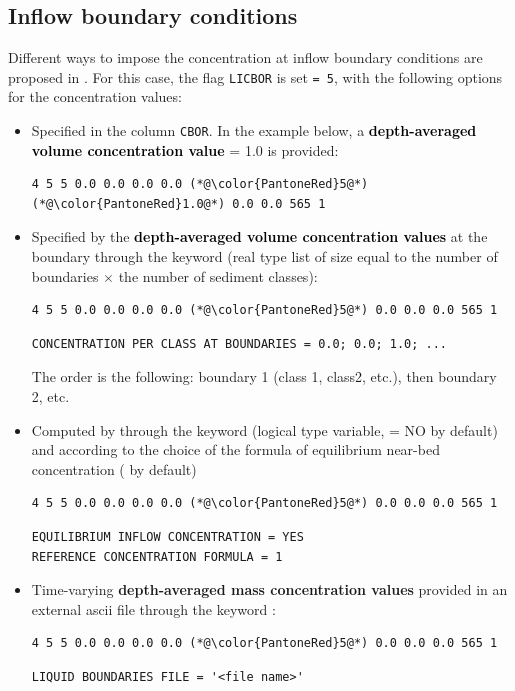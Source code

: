\subsection{Inflow boundary conditions}
Different ways to impose the concentration at inflow boundary conditions are proposed in \sisyphe. For this case, the flag \texttt{LICBOR} is set \texttt{= 5}, with the following options for the concentration values:
\begin{itemize}
\item Specified in the column \texttt{CBOR}. In the example below, a \textcolor{black}{\textbf{depth-averaged volume concentration value}} {\ttfamily = 1.0} is provided:
\begin{lstlisting}[frame=trBL]
4 5 5 0.0 0.0 0.0 0.0 (*@\color{PantoneRed}5@*) (*@\color{PantoneRed}1.0@*) 0.0 0.0 565 1
\end{lstlisting}
\item Specified by the \textcolor{black}{\textbf{depth-averaged volume concentration values}} at the boundary through the keyword  (real type list of size equal to the number of boundaries $\times$ the number of sediment classes):
\begin{lstlisting}[frame=trBL]
4 5 5 0.0 0.0 0.0 0.0 (*@\color{PantoneRed}5@*) 0.0 0.0 0.0 565 1
\end{lstlisting}
\begin{lstlisting}[frame=trBL]
CONCENTRATION PER CLASS AT BOUNDARIES = 0.0; 0.0; 1.0; ...
\end{lstlisting}
The order is the following: boundary 1 (class 1, class2, etc.), then boundary 2, etc.
\item Computed by \sisyphe{} through the keyword  (logical type variable, {\ttfamily = NO} by default) and according to the choice of the formula of equilibrium near-bed concentration ( by default)
\begin{lstlisting}[frame=trBL]
4 5 5 0.0 0.0 0.0 0.0 (*@\color{PantoneRed}5@*) 0.0 0.0 0.0 565 1
\end{lstlisting}
\begin{lstlisting}[frame=trBL]
EQUILIBRIUM INFLOW CONCENTRATION = YES
REFERENCE CONCENTRATION FORMULA = 1
\end{lstlisting}    
\item Time-varying {\textbf{depth-averaged mass concentration values}} provided in an external ascii file through the keyword :
\begin{lstlisting}[frame=trBL]
4 5 5 0.0 0.0 0.0 0.0 (*@\color{PantoneRed}5@*) 0.0 0.0 0.0 565 1
\end{lstlisting}
\begin{lstlisting}[frame=trBL]
LIQUID BOUNDARIES FILE = '<file name>'
\end{lstlisting}     
\end{itemize}

